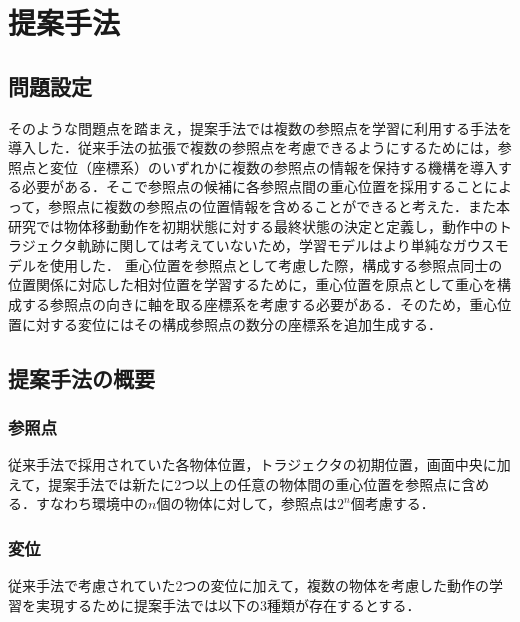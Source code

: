 ﻿%



\chapter{提案手法}

\section{問題設定}

そのような問題点を踏まえ，提案手法では複数の参照点を学習に利用する手法を導入した．従来手法の拡張で複数の参照点を考慮できるようにするためには，参照点と変位（座標系）のいずれかに複数の参照点の情報を保持する機構を導入する必要がある．そこで参照点の候補に各参照点間の重心位置を採用することによって，参照点に複数の参照点の位置情報を含めることができると考えた．また本研究では物体移動動作を初期状態に対する最終状態の決定と定義し，動作中のトラジェクタ軌跡に関しては考えていないため，学習モデルはより単純なガウスモデルを使用した．
重心位置を参照点として考慮した際，構成する参照点同士の位置関係に対応した相対位置を学習するために，重心位置を原点として重心を構成する参照点の向きに軸を取る座標系を考慮する必要がある．そのため，重心位置に対する変位にはその構成参照点の数分の座標系を追加生成する．

\section{提案手法の概要}

\subsection{参照点}

従来手法で採用されていた各物体位置，トラジェクタの初期位置，画面中央に加えて，提案手法では新たに2つ以上の任意の物体間の重心位置を参照点に含める．すなわち環境中の$n$個の物体に対して，参照点は$2^{n}$個考慮する．

\subsection{変位}

従来手法で考慮されていた2つの変位に加えて，複数の物体を考慮した動作の学習を実現するために提案手法では以下の3種類が存在するとする．

